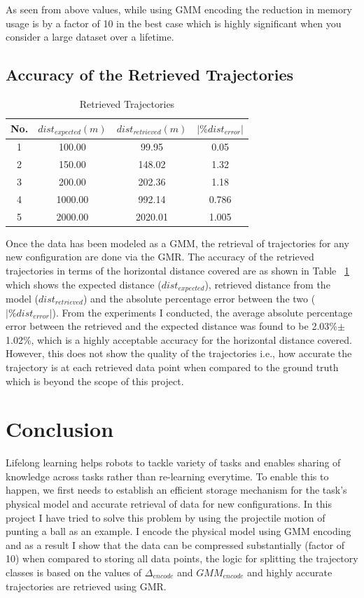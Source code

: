 \documentclass[conference]{IEEEtran}
\begin{document}
As seen from above values, while using GMM encoding the reduction in memory usage is by a factor of 10 in the best case which is highly significant when you consider a large dataset over a lifetime.

\subsection{Accuracy of the Retrieved Trajectories}
\begin{table}[t]\renewcommand{\arraystretch}{1.5}\addtolength{\tabcolsep}{-1pt}
\centering
\caption{Retrieved Trajectories}
\begin{tabular}{  | c | c | c | c |}
  \hline
  No. & $dist_{expected} (m)$ & $dist_{retrieved} (m)$ & $|\% dist_{error}|$\\
  \hline 
  1 & 100.00 & 99.95 & 0.05\\
  2 & 150.00 & 148.02 & 1.32\\
  3 & 200.00 & 202.36 & 1.18\\
  4 & 1000.00 & 992.14 & 0.786\\
  5 & 2000.00 & 2020.01 & 1.005\\
  \hline
\end{tabular}
\label{tab:tab2}
\end{table}

Once the data has been modeled as a GMM, the retrieval of trajectories for any new configuration are done via the GMR. The accuracy of the retrieved trajectories in terms of the horizontal distance covered are as shown in Table ~\ref{tab:tab2} which shows the expected distance ($dist_{expected}$), retrieved distance from the model ($dist_{retrieved}$) and the absolute percentage error between the two ($|\% dist_{error}|$). From the experiments I conducted, the average absolute percentage error between the retrieved and the expected distance was found to be 2.03\%$\pm$1.02\%, which is a highly acceptable accuracy for the horizontal distance covered. However, this does not show the quality of the trajectories i.e., how accurate the trajectory is at each retrieved data point when compared to the ground truth which is beyond the scope of this project. 

\section{Conclusion}
Lifelong learning helps robots to tackle variety of tasks and enables sharing of knowledge across tasks rather than re-learning everytime. To enable this to happen, we first needs to establish an efficient storage mechanism for the task's physical model and accurate retrieval of data for new configurations. In this project I have tried to solve this problem by using the projectile motion of punting a ball as an example. I encode the physical model using GMM encoding and as a result I show that the data can be compressed substantially (factor of 10) when compared to storing all data points, the logic for splitting the trajectory classes is based on the values of $\Delta_{encode}$ and $GMM_{encode}$ and highly accurate trajectories are retrieved using GMR.
\end{document}
